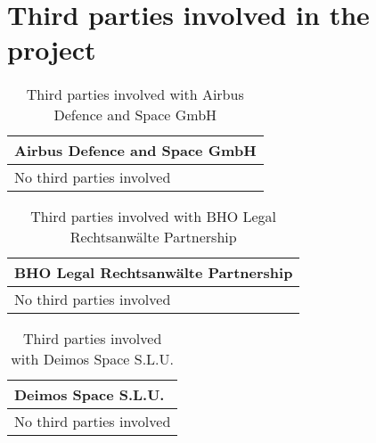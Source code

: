 \section{Third parties involved in the project}

\begin{table}[H]
	\centering
	\begin{tabular}{|p{10cm}|p{4cm}|}
		\hline
		
		\multicolumn{2}{|p{14cm}|}{\textbf{Airbus Defence and Space GmbH}}\\
		
		\hline

		\multicolumn{2}{|p{14cm}|}{No third parties involved}\\
		
		\hline
	\end{tabular}
	\caption{Third parties involved with Airbus Defence and Space GmbH}
\end{table}



\begin{table}[H]
	\centering
	\begin{tabular}{|p{10cm}|p{4cm}|}
		\hline
		
		\multicolumn{2}{|p{14cm}|}{\textbf{BHO Legal Rechtsanwälte Partnership}}\\
		
		\hline
		
		\multicolumn{2}{|p{14cm}|}{No third parties involved}\\
		
		\hline
		
	\end{tabular}
	\caption{Third parties involved with BHO Legal Rechtsanwälte Partnership}
\end{table}



\begin{table}[H]
	\centering
	\begin{tabular}{|p{10cm}|p{4cm}|}
		\hline
		
		\multicolumn{2}{|p{14cm}|}{\textbf{Deimos Space S.L.U.}}\\
		
		\hline
		
		\multicolumn{2}{|p{14cm}|}{No third parties involved}\\
		
		\hline
		
	\end{tabular}
	\caption{Third parties involved with Deimos Space S.L.U.}
\end{table}



